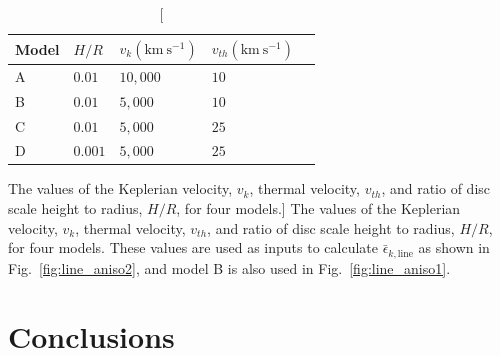 \begin{table}
\centering
\begin{tabular}{p{1cm}p{2cm}p{2cm}p{2cm}p{2cm}}
\hline
Model & $H/R$ & $v_k (\mathrm{km~s^{-1}})$ & $v_{th} (\mathrm{km~s^{-1}})$ \\
\hline \hline 
A & $0.01$ & $10,000$ & $10$ \\
B & $0.01$ & $5,000$ & $10$ \\
C & $0.01$ & $5,000$ & $25$ \\
D & $0.001$ & $5,000$ & $25$ \\
\hline 
\end{tabular}
\caption
[The values of the Keplerian velocity, $v_k$, thermal velocity, $v_{th}$,
and ratio of disc scale height to radius, $H/R$, for four models.]
{
The values of the Keplerian velocity, $v_k$, thermal velocity, $v_{th}$,
and ratio of disc scale height to radius, $H/R$, for four models. These values
are used as inputs to calculate $\bar{\epsilon}_{k,\mathrm{line}}$ as shown in 
Fig.~\ref{fig:line_aniso2}, and model B is also used in 
Fig.~\ref{fig:line_aniso1}.
}
\label{tab:line_mods}
\end{table}



\section{Conclusions}
\label{sec:ew_conclusions}

